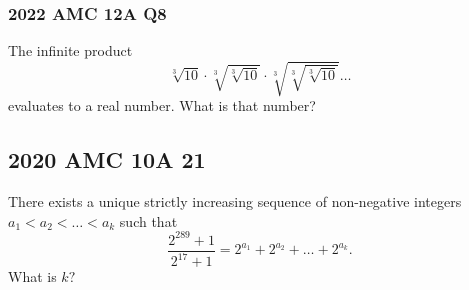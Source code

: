 \documentclass{article}
\begin{document}
\vspace{100px}

\subsubsection{2022 AMC 12A Q8}
The infinite product\[\sqrt[3]{10} \cdot \sqrt[3]{\sqrt[3]{10}} \cdot \sqrt[3]{\sqrt[3]{\sqrt[3]{10}}} \ldots\]evaluates to a real number. What is that number?

\pagebreak

\subsection{2020 AMC 10A 21}

There exists a unique strictly increasing sequence of non-negative integers $a_1 < a_2 < … < a_k$ such that\[\frac{2^{289}+1}{2^{17}+1} = 2^{a_1} + 2^{a_2} + … + 2^{a_k}.\]What is $k?$
\end{document}
